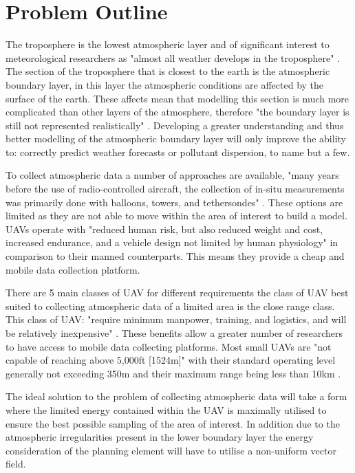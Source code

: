 \section{Problem Outline}
The troposphere is the lowest atmospheric layer and of significant interest to meteorological researchers as "almost all weather develops in the troposphere" \cite{NatGeo}. The section of the troposphere that is closest to the earth is the atmospheric boundary layer, in this layer the atmospheric conditions are affected by the surface of the earth. These affects mean that modelling this section is much more complicated than other layers of the atmosphere, therefore "the boundary layer is still not represented realistically" \cite{Teixeira2008}. Developing a greater understanding and thus better modelling of the atmospheric boundary layer will only improve the ability to: correctly predict weather forecasts or pollutant dispersion, to name but a few. 

To collect atmospheric data a number of approaches are available, "many years before the use of radio-controlled aircraft, the collection of in-situ measurements was primarily done with balloons, towers, and tethersondes" \cite{Bonin2011}. These options are limited as they are not able to move within the area of interest to build a model. UAVs operate with "reduced human risk, but also reduced weight and cost, increased endurance, and a vehicle design not limited by human physiology" \cite{Pepper2012} in comparison to their manned counterparts. This means they provide a cheap and mobile data collection platform.

There are 5 main classes of UAV for different requirements \cite{Sarris2001}  the class of UAV best suited to collecting atmospheric data of a limited area is the close range class. This class of UAV: "require minimum manpower, training, and logistics, and will be relatively inexpensive" \cite{FasDod}. These benefits allow a greater number of researchers to have access to mobile data collecting platforms. Most small UAVs are "not capable of reaching above 5,000ft [1524m]" \cite{Weibel2005} with their standard operating level generally not exceeding 350m and their maximum range being less than 10km \cite{Blyenburgh2000}.

The ideal solution to the problem of collecting atmospheric data will take a form where the limited energy contained within the UAV is maximally utilised to ensure the best possible sampling of the area of interest. In addition due to the atmospheric irregularities present in the lower boundary layer the energy consideration of the planning element will have to utilise a non-uniform vector field. 
